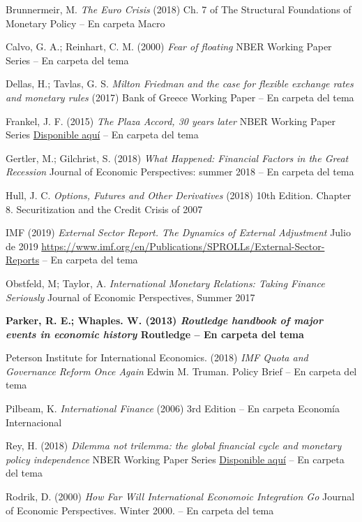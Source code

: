 \documentclass{nuevotema}
\begin{document}
Brunnermeir, M. \textit{The Euro Crisis} (2018) Ch. 7 of The Structural Foundations of Monetary Policy -- En carpeta Macro

Calvo, G. A.; Reinhart, C. M. (2000) \textit{Fear of floating} NBER Working Paper Series -- En carpeta del tema 

Dellas, H.; Tavlas, G. S. \textit{Milton Friedman and the case for flexible exchange rates and monetary rules} (2017) Bank of Greece Working Paper -- En carpeta del tema

Frankel, J. F. (2015) \textit{The Plaza Accord, 30 years later} NBER Working Paper Series \href{https://www.nber.org/papers/w21813.pdf}{Disponible aquí} -- En carpeta del tema

Gertler, M.; Gilchrist, S. (2018) \textit{What Happened: Financial Factors in the Great Recession} Journal of Economic Perspectives: summer 2018 -- En carpeta del tema

Hull, J. C. \textit{Options, Futures and Other Derivatives} (2018) 10th Edition. Chapter 8. Securitization and the Credit Crisis of 2007

IMF (2019) \textit{External Sector Report. The Dynamics of External Adjustment} Julio de 2019 \url{https://www.imf.org/en/Publications/SPROLLs/External-Sector-Reports} -- En carpeta del tema

Obstfeld, M; Taylor, A. \textit{International Monetary Relations: Taking Finance Seriously} Journal of Economic Perspectives, Summer 2017

\textbf{Parker, R. E.; Whaples. W. (2013) \textit{Routledge handbook of major events in economic history} Routledge -- En carpeta del tema}

Peterson Institute for International Economics. (2018) \textit{IMF Quota and Governance Reform Once Again} Edwin M. Truman. Policy Brief -- En carpeta del tema

Pilbeam, K. \textit{International Finance} (2006) 3rd Edition -- En carpeta Economía Internacional

Rey, H. (2018) \textit{Dilemma not trilemma: the global financial cycle and monetary policy independence} NBER Working Paper Series \href{https://www.nber.org/papers/w21162.pdf}{Disponible aquí} -- En carpeta del tema

Rodrik, D. (2000) \textit{How Far Will International Economoic Integration Go} Journal of Economic Perspectives. Winter 2000. -- En carpeta del tema
\end{document}
